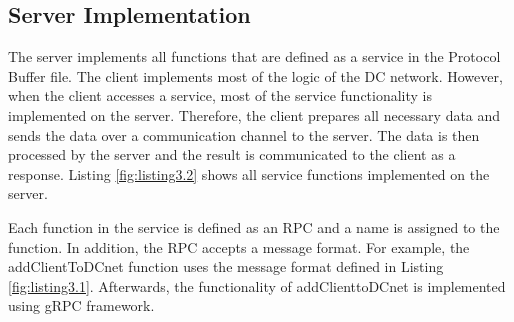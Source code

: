 \subsection{Server Implementation}
The server implements all functions that are defined as a service in the Protocol Buffer file. The client implements most of the logic of the DC network. However, when the client accesses a service, most of the service functionality is implemented on the server. Therefore, the client prepares all necessary data and sends the data over a communication channel to the server. The data is then processed by the server and the result is communicated to the client as a response. Listing \ref{fig:listing3.2} shows all service functions implemented on the server. %
\begin{nobreak} 
Each function in the service is defined as an RPC and a name is assigned to the function. In addition, the RPC accepts a message format. For example, the addClientToDCnet function uses the message format defined in Listing \ref{fig:listing3.1}. Afterwards, the functionality of addClienttoDCnet is implemented using gRPC framework.
\end{nobreak}
\clearpage
\\


\\ %
